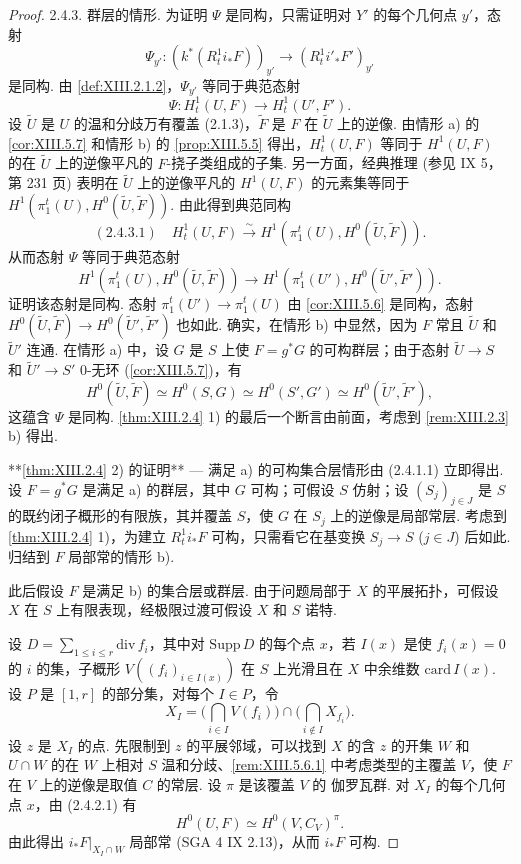 \begin{proof}
2.4.3. 群层的情形. 为证明 $\Psi$ 是同构，只需证明对 $Y'$ 的每个几何点 $y'$，态射
\[
\Psi_{y'} \colon (k^{*}(R^1_t i_* F))_{y'} \longrightarrow (R^1_t i'_* F')_{y'}
\]
是同构. 由 \ref{def:XIII.2.1.2}，$\Psi_{y'}$ 等同于典范态射
\[
\Psi \colon H^1_t(U, F) \longrightarrow H^1_t(U', F').
\]
设 $\widetilde{U}$ 是 $U$ 的温和分歧万有覆盖 (2.1.3)，$\widetilde{F}$ 是 $F$ 在 $\widetilde{U}$ 上的逆像. 由情形 a) 的 \ref{cor:XIII.5.7} 和情形 b) 的 \ref{prop:XIII.5.5} 得出，$H^1_t(U, F)$ 等同于 $H^1(U, F)$ 的在 $\widetilde{U}$ 上的逆像平凡的 $F$-挠子类组成的子集. 另一方面，经典推理 (参见 IX 5，第 231 页) 表明在 $\widetilde{U}$ 上的逆像平凡的 $H^1(U, F)$ 的元素集等同于 $H^1(\pi^t_1(U), H^0(\widetilde{U}, \widetilde{F}))$. 由此得到典范同构
\[
(2.4.3.1) \quad H^1_t(U, F) \xrightarrow{\sim} H^1(\pi^t_1(U), H^0(\widetilde{U}, \widetilde{F})).
\]
从而态射 $\Psi$ 等同于典范态射
\[
H^1(\pi^t_1(U), H^0(\widetilde{U}, \widetilde{F})) \longrightarrow H^1(\pi^t_1(U'), H^0(\widetilde{U}', \widetilde{F}')).
\]
证明该态射是同构. 态射 $\pi^t_1(U') \to \pi^t_1(U)$ 由 \ref{cor:XIII.5.6} 是同构，态射 $H^0(\widetilde{U}, \widetilde{F}) \to H^0(\widetilde{U}', \widetilde{F}')$ 也如此. 确实，在情形 b) 中显然，因为 $F$ 常且 $\widetilde{U}$ 和 $\widetilde{U}'$ 连通. 在情形 a) 中，设 $G$ 是 $S$ 上使 $F = g^{*} G$ 的可构群层；由于态射 $\widetilde{U} \to S$ 和 $\widetilde{U}' \to S'$ 0-无环 (\cref{cor:XIII.5.7})，有
\[
H^0(\widetilde{U}, \widetilde{F}) \simeq H^0(S, G) \simeq H^0(S', G') \simeq H^0(\widetilde{U}', \widetilde{F}'),
\]
这蕴含 $\Psi$ 是同构. \ref{thm:XIII.2.4} 1) 的最后一个断言由前面，考虑到 \ref{rem:XIII.2.3} b) 得出.

**\ref{thm:XIII.2.4} 2) 的证明** — 满足 a) 的可构集合层情形由 (2.4.1.1) 立即得出. 设 $F = g^{*} G$ 是满足 a) 的群层，其中 $G$ 可构；可假设 $S$ 仿射；设 $(S_j)_{j \in J}$ 是 $S$ 的既约闭子概形的有限族，其并覆盖 $S$，使 $G$ 在 $S_j$ 上的逆像是局部常层. 考虑到 \ref{thm:XIII.2.4} 1)，为建立 $R^1_t i_* F$ 可构，只需看它在基变换 $S_j \to S$ ($j \in J$) 后如此. 归结到 $F$ 局部常的情形 b).

此后假设 $F$ 是满足 b) 的集合层或群层. 由于问题局部于 $X$ 的平展拓扑，可假设 $X$ 在 $S$ 上有限表现，经极限过渡可假设 $X$ 和 $S$ 诺特.

设 $D = \sum_{1 \leqslant i \leqslant r} \mathrm{div}\, f_i$，其中对 $\mathrm{Supp}\, D$ 的每个点 $x$，若 $I(x)$ 是使 $f_i(x) = 0$ 的 $i$ 的集，子概形 $V((f_i)_{i \in I(x)})$ 在 $S$ 上光滑且在 $X$ 中余维数 $\mathrm{card}\, I(x)$. 设 $P$ 是 $[1, r]$ 的部分集，对每个 $I \in P$，令
\[
X_I = \Big(\bigcap_{i \in I} V(f_i)\Big) \cap \Big(\bigcap_{i \notin I} X_{f_i}\Big).
\]
设 $z$ 是 $X_I$ 的点. 先限制到 $z$ 的平展邻域，可以找到 $X$ 的含 $z$ 的开集 $W$ 和 $U \cap W$ 的在 $W$ 上相对 $S$ 温和分歧、\ref{rem:XIII.5.6.1} 中考虑类型的主覆盖 $V$，使 $F$ 在 $V$ 上的逆像是取值 $C$ 的常层. 设 $\pi$ 是该覆盖 $V$ 的 伽罗瓦群. 对 $X_I$ 的每个几何点 $x$，由 (2.4.2.1) 有
\[
H^0(U, F) \simeq H^0(V, C_V)^{\pi}.
\]
由此得出 $i_* F|_{X_I \cap W}$ 局部常 (SGA 4 IX 2.13)，从而 $i_* F$ 可构.


\end{proof}
